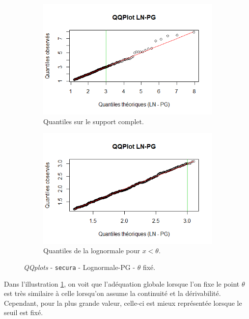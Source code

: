 		\begin{figure}[H]
			\begin{center}
				\begin{subfigure}[b]{0.45\textwidth}
					\includegraphics[scale=0.65]{Graphiques/QQ_LN_PG_choix_secura} 
					\caption{Quantiles sur le support complet.} \label{QQplot_LN_PG_choix_secura}
				\end{subfigure}
				\begin{subfigure}[b]{0.4\textwidth}
					\includegraphics[scale=0.65]{Graphiques/QQ_LN_PG_choix_t1_secura} 
					\caption{Quantiles de la lognormale pour $x<\theta$.} \label{QQplot_LN_PG_choix_2_secura}
				\end{subfigure}
				\renewcommand{\figurename}{Illustration}
				\caption{\textit{QQplots} - \texttt{secura} - Lognormale-PG - $\theta$ fixé.}
			\end{center}
		\end{figure}
		Dans l'illustration \ref{QQplot_LN_PG_choix_secura}, on voit que l'adéquation globale lorsque l'on fixe le point $\theta$ est très similaire à celle lorsqu'on assume la continuité et la dérivabilité. Cependant, pour la plus grande valeur, celle-ci est mieux représentée lorsque le seuil est fixé.
		
